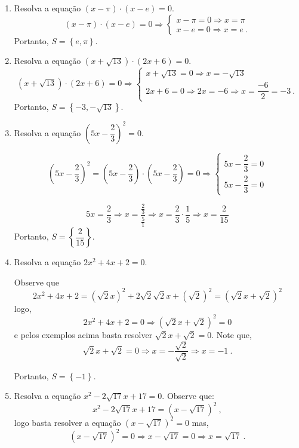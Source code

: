 \begin{exem}
\begin{enumerate}[1)]
\item Resolva a equação $(x - \pi) \cdot (x - e)= 0$.
\[(x - \pi) \cdot (x - e)= 0 \Rightarrow
\begin{cases}
 x - \pi=0 \Rightarrow x= \pi \\
 x - e= 0 \Rightarrow x= e \ .
\end{cases} \]
Portanto, $S= \left\{ e, \pi \right\}$.

\item Resolva a equação $(x + \sqrt{13}) \cdot (2x + 6)= 0$.
\[(x + \sqrt{13}) \cdot (2x + 6)= 0 \Rightarrow
\begin{cases}
 x + \sqrt{13}=0 \Rightarrow x= - \sqrt{13} \\
 2x + 6= 0 \Rightarrow 2x= -6 \Rightarrow x= \dfrac{-6}{2}= -3 \ .
\end{cases} \]
Portanto, $S= \left\{ -3, - \sqrt{13} \right\}$.

\item Resolva a equação $\left(5x - \dfrac{2}{3} \right)^2= 0$.

\[\left(5x - \dfrac{2}{3} \right)^2= \left(5x - \dfrac{2}{3} \right) \cdot \left(5x - \dfrac{2}{3} \right)= 0 \Rightarrow
\begin{cases}
 5x - \dfrac{2}{3}= 0  \\
 5x - \dfrac{2}{3}= 0
\end{cases} \]

\[5x= \dfrac{2}{3} \Rightarrow x= \dfrac{\frac{2}{3}}{\frac{5}{1}} \Rightarrow x= \dfrac{2}{3} \cdot \dfrac{1}{5} \Rightarrow x= \dfrac{2}{15}\]
Portanto, $S= \left\{ \dfrac{2}{15} \right\}$.

\item Resolva a equação $2x^2 + 4x + 2=0$.

 Observe que
 \[2x^2 + 4x + 2= (\sqrt{2}x)^2 + 2 \sqrt{2}\sqrt{2}x + (\sqrt{2})^2= (\sqrt{2}x + \sqrt{2})^2\]
 logo,
 \[2x^2 + 4x + 2=0 \Rightarrow (\sqrt{2}x + \sqrt{2})^2= 0\]
 e pelos exemplos acima basta resolver $\sqrt{2}x + \sqrt{2}= 0$. Note que,
\[\sqrt{2}x + \sqrt{2} =0 \Rightarrow x= - \dfrac{\sqrt{2}}{\sqrt{2}} \Rightarrow x= -1 \ .\]

Portanto, $S= \left\{ -1 \right\}$.

\item Resolva a equação $x^2 - 2\sqrt{17}x + 17=0$.
Observe que:
\[x^2 - 2\sqrt{17}x + 17= (x - \sqrt{17})^2 \ ,\]
logo basta resolver a equação $(x - \sqrt{17})^2= 0$ mas,
\[(x - \sqrt{17})^2= 0 \Rightarrow x - \sqrt{17}= 0 \Rightarrow x= \sqrt{17} \ .\]


\end{enumerate}
\end{exem}
